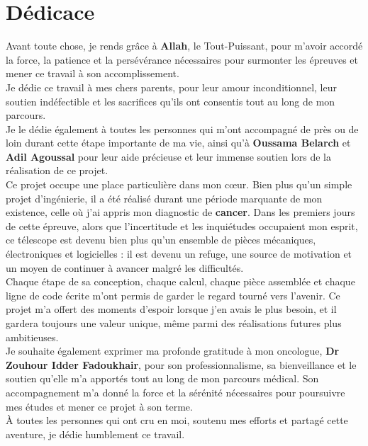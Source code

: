 \documentclass[12pt,a4paper]{report}
\begin{document}
\chapter*{Dédicace}
\begin{center}
\itshape


Avant toute chose, je rends grâce à \textbf{Allah}, le Tout-Puissant, pour m'avoir accordé la force, la patience et la persévérance nécessaires pour surmonter les épreuves et mener ce travail à son accomplissement.\\

Je dédie ce travail à mes chers parents, pour leur amour inconditionnel, leur soutien indéfectible et les sacrifices qu'ils ont consentis tout au long de mon parcours.\\

Je le dédie également à toutes les personnes qui m'ont accompagné de près ou de loin durant cette étape importante de ma vie, ainsi qu’à \textbf{Oussama Belarch} et \textbf{Adil Agoussal} pour leur aide précieuse et leur immense soutien lors de la réalisation de ce projet.\\

Ce projet occupe une place particulière dans mon cœur. Bien plus qu'un simple projet d'ingénierie, il a été réalisé durant une période marquante de mon existence, celle où j'ai appris mon diagnostic de \textbf{cancer}. Dans les premiers jours de cette épreuve, alors que l'incertitude et les inquiétudes occupaient mon esprit, ce télescope est devenu bien plus qu'un ensemble de pièces mécaniques, électroniques et logicielles : il est devenu un refuge, une source de motivation et un moyen de continuer à avancer malgré les difficultés.\\

Chaque étape de sa conception, chaque calcul, chaque pièce assemblée et chaque ligne de code écrite m'ont permis de garder le regard tourné vers l'avenir. Ce projet m'a offert des moments d'espoir lorsque j'en avais le plus besoin, et il gardera toujours une valeur unique, même parmi des réalisations futures plus ambitieuses.\\

Je souhaite également exprimer ma profonde gratitude à mon oncologue, \textbf{Dr Zouhour Idder Fadoukhair}, pour son professionnalisme, sa bienveillance et le soutien qu'elle m'a apportés tout au long de mon parcours médical. Son accompagnement m'a donné la force et la sérénité nécessaires pour poursuivre mes études et mener ce projet à son terme.\\

À toutes les personnes qui ont cru en moi, soutenu mes efforts et partagé cette aventure, je dédie humblement ce travail.
\end{center}
\end{document}
